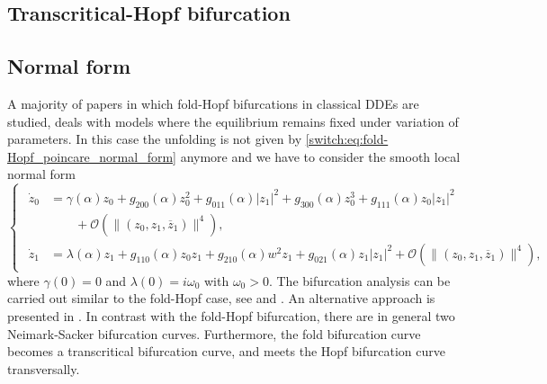 \begin{subappendices}
\section{Transcritical-Hopf bifurcation}
\label{switch:Appendix_TH}
\subsection{Normal form}\label{switch:sec:HT_predictors}
A majority of papers in which fold-Hopf bifurcations in classical DDEs are studied, deals with models where the equilibrium remains fixed under variation of parameters. In this case the unfolding is not given by \cref{switch:eq:fold-Hopf_poincare_normal_form} anymore and we have to consider the smooth local normal form
%
\begin{equation*}
\begin{cases}
\begin{aligned}
\dot{z}_{0} & =\gamma(\alpha)z_{0}+g_{200}(\alpha)z_{0}^{2}+g_{011}(\alpha)|z_{1}|^{2}+g_{300}(\alpha)z_{0}^{3}+g_{111}(\alpha)z_{0}|z_{1}|^{2}\\
 & \qquad+\mathcal{O}\left(\|\left(z_{0},z_{1},\overline{z}_{1}\right)\|^{4}\right),\\
\dot{z}_{1} & =\lambda(\alpha)z_{1}+g_{110}(\alpha)z_{0}z_{1}+g_{210}(\alpha)w^{2}z_{1}+g_{021}(\alpha)z_{1}|z_{1}|^{2}+\mathcal{O}\left(\|\left(z_{0},z_{1},\overline{z}_{1}\right)\|^{4}\right),
\end{aligned}
\end{cases}\label{switch:eq:fold-Hopf_poincare_normal_form-2}
\end{equation*}
where $\gamma(0)=0$ and $\lambda(0)=i\omega_0$ with $\omega_0>0$.
%
The bifurcation analysis can be carried out similar to the fold-Hopf case, see \cite{Guo2008} and \cite{Wang2010Hopftranscritical}. An alternative approach is presented in \cite{Wu2012}. In contrast with the fold-Hopf bifurcation,
there are in general two Neimark-Sacker bifurcation curves. Furthermore, the fold bifurcation curve becomes a transcritical bifurcation curve, and meets the Hopf bifurcation curve transversally.


\end{subappendices}
